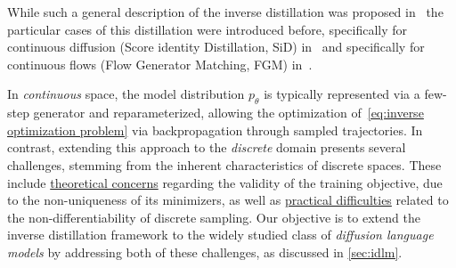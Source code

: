 

  While such a general description of the inverse distillation was proposed in~\citep{kornilov2025universal} the particular cases of this distillation were introduced before, specifically for continuous diffusion (Score identity Distillation, SiD) in~\citep{zhou2024score} and specifically for continuous flows (Flow Generator Matching, FGM) in~\citep{huang2024flow}. 

    In \emph{continuous} space, the model distribution $p_\theta$ is typically represented via a few-step generator and reparameterized, allowing the optimization of~\eqref{eq:inverse optimization problem} via backpropagation through sampled trajectories. In contrast, extending this approach to the \emph{discrete} domain presents several challenges, stemming from the inherent characteristics of discrete spaces. These include \underline{theoretical concerns} regarding the validity of the training objective, due to the non-uniqueness of its minimizers, as well as \underline{practical difficulties} related to the non-differentiability of discrete sampling. Our objective is to extend the inverse distillation framework to the widely studied class of \emph{diffusion language models} by addressing both of these challenges, as discussed in \wasyparagraph\ref{sec:idlm}.
  
